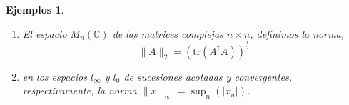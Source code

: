 \documentclass[12pt]{book}
\newtheorem{listaejemplos}{\bf Ejemplos}[chapter]
\begin{document}
\begin{listaejemplos}
\begin{enumerate}
Para probar la desigualdad triangular vamos a probar primero la desigualdad,
$$\left\vert\textrm{Re}\int_a^b f(x)g^*(x)\,dx\right\vert\leq \left(\int_a^b\lvert f(x)
\rvert^2\,dx\right)^\frac{1}{2}\left(\int_a^b\lvert g(x)\rvert^2\,dx\right)^\frac{1}{2}.$$
Para probar esta desigualdad, consideremos $\lambda\in\mathbb{R}$ cualquiera. Entonces  se 
debe cumplir,
\begin{eqnarray*}
0&\leq&\lVert f+\lambda g\rVert^2 =\int_a^b\lvert f(x)+\lambda g(x)\rvert^2\,dx\\
&=&\lVert f\rVert^2+\lambda^2\lVert g\rVert^2 +2\lambda\int_a^b\textrm{Re}(f(x)g^*(x))\,dx\\
&=&\lambda^2\alpha+2\beta\lambda +\gamma
\end{eqnarray*}
donde $\alpha=\lVert g\rVert^2$, $\gamma=\lVert f\rVert^2$ y $\beta=\int_a^b\textrm{Re}(f(x)g^*(x))
\,dx$. Para que la par\'abola descrita  por el polinomio $\lambda^2\alpha+2\lambda\beta+\gamma$ 
sea siempre positiva o cero, solo puede tener a lo sumo una ra\'{\i}z. Es decir, el discriminante debe 
ser menor o igual a cero, esto es, 

de donde,
$$\left\vert\textrm{Re}\int_a^bf(x)g^*(x)\,dx\right\vert\leq\lVert f\rVert\lVert g\rVert$$


Ahora podemos proceder a probar la desigualdad triangular, ya que,
\begin{eqnarray*}
0&\leq&\lVert f+g\rVert^2 = \lVert f\rVert^2+\lVert g\rVert^2 +2\textrm{Re}\int_a^b f(x)g^*(x)\,dx\\
&\leq& \lVert f\rVert^2+\lVert g\rVert^2 + 2\lVert f\rVert\lVert g\rVert=(\lVert f\rVert+\lVert g\rVert)^2
\end{eqnarray*}
de donde se deduce la desigualdad buscada.
\item El espacio $M_n(\mathbb{C})$ de  las matrices complejas $n\times n$, definimos la norma,
$$\lVert A\rVert_2=\left(\textrm{tr}(A^\dagger A)\right)^\frac{1}{2}$$
 \item en los espacios $l_\infty$ y $l_0$  de sucesiones acotadas y convergentes, respectivamente, 
la norma $\lVert x\rVert_\infty =\sup_n(\lvert x_n\rvert)$.
\end{enumerate}
\end{listaejemplos}
 
\end{document}
